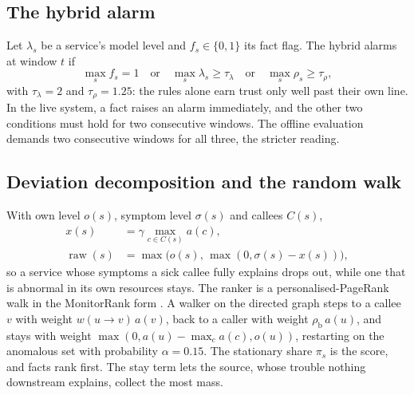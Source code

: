 \subsection{The hybrid alarm}
Let $\lambda_s$ be a service's model level and $f_s \in \{0,1\}$ its fact flag. The hybrid alarms at window $t$ if
\begin{equation}
\max_s f_s = 1 \quad\text{or}\quad \max_s \lambda_s \ge \tau_\lambda \quad\text{or}\quad \max_s \rho_s \ge \tau_\rho,
\end{equation}
with $\tau_\lambda = 2$ and $\tau_\rho = 1.25$: the rules alone earn trust only well past their own line. In the live system, a fact raises an alarm immediately, and the other two conditions must hold for two consecutive windows. The offline evaluation demands two consecutive windows for all three, the stricter reading.

\subsection{Deviation decomposition and the random walk}
\label{sec:rca}
With own level $o(s)$, symptom level $\sigma(s)$ and callees $C(s)$,
\begin{align}
x(s) &= \gamma \max_{c \in C(s)} a(c), \nonumber\\
\operatorname{raw}(s) &= \max\bigl(o(s),\, \max(0, \sigma(s) - x(s))\bigr),
\end{align}
so a service whose symptoms a sick callee fully explains drops out, while one that is abnormal in its own resources stays. The ranker is a personalised-PageRank walk in the MonitorRank form \cite{kim2013monitorrank}. A walker on the directed graph steps to a callee $v$ with weight $w(u \to v)\, a(v)$, back to a caller with weight $\rho_{\mathrm b}\, a(u)$, and stays with weight $\max(0, a(u) - \max_c a(c), o(u))$, restarting on the anomalous set with probability $\alpha = 0.15$. The stationary share $\pi_s$ is the score, and facts rank first. The stay term lets the source, whose trouble nothing downstream explains, collect the most mass.

